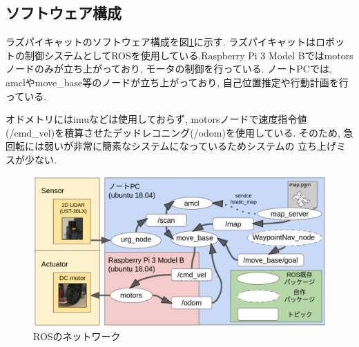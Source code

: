\subsection{ソフトウェア構成}
ラズパイキャットのソフトウェア構成を図\ref{fig:raspicat-software-config}に示す.
ラズパイキャットはロボットの制御システムとしてROSを使用している.Raspberry Pi 3 Model Bではmotorsノードのみが立ち上がっており, 
モータの制御を行っている. 
ノートPCでは, amclやmove\_base等のノードが立ち上がっており, 
自己位置推定や行動計画を行っている.

オドメトリにはimuなどは使用しておらず, 
motorsノードで速度指令値(/cmd\_vel)を積算させたデッドレコニング(/odom)を使用している. 
そのため, 急回転には弱いが非常に簡素なシステムになっているためシステムの
立ち上げミスが少ない.

\begin{figure}[H]
	\begin{center}
		\includegraphics[width=0.9\linewidth]{figs/raspicat-software-config.pdf}
		\caption{ROSのネットワーク}
		\label{fig:raspicat-software-config}
	\end{center}
\end{figure}
